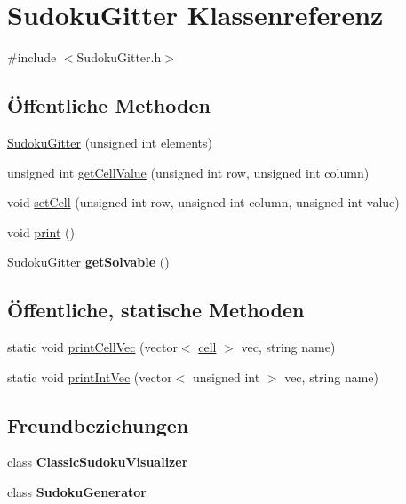 \hypertarget{class_sudoku_gitter}{\section{Sudoku\-Gitter Klassenreferenz}
\label{class_sudoku_gitter}
}


{\ttfamily \#include $<$Sudoku\-Gitter.\-h$>$}

\subsection*{Öffentliche Methoden}
\begin{DoxyCompactItemize}
\item 
\hyperlink{class_sudoku_gitter_ad3443d5846cba4cef8fdfebc46f16c0b}{Sudoku\-Gitter} (unsigned int elements)
\item 
unsigned int \hyperlink{class_sudoku_gitter_aedc91eeba50722d3b4deb0609a27aedf}{get\-Cell\-Value} (unsigned int row, unsigned int column)
\item 
void \hyperlink{class_sudoku_gitter_aa7fa54638ade311994bd8f6433df8ff0}{set\-Cell} (unsigned int row, unsigned int column, unsigned int value)
\item 
void \hyperlink{class_sudoku_gitter_a771332a8a5eff5e1917538adfb237d0e}{print} ()
\item 
\hypertarget{class_sudoku_gitter_ad089a50f3435a3eb025aacab74b8fbed}{\hyperlink{class_sudoku_gitter}{Sudoku\-Gitter} {\bfseries get\-Solvable} ()}\label{class_sudoku_gitter_ad089a50f3435a3eb025aacab74b8fbed}

\end{DoxyCompactItemize}
\subsection*{Öffentliche, statische Methoden}
\begin{DoxyCompactItemize}
\item 
static void \hyperlink{class_sudoku_gitter_a8bbf319c21d2cd6111d36082d3abf78d}{print\-Cell\-Vec} (vector$<$ \hyperlink{structcell}{cell} $>$ vec, string name)
\item 
static void \hyperlink{class_sudoku_gitter_a8496c0d45f5a35e97703787c6756330b}{print\-Int\-Vec} (vector$<$ unsigned int $>$ vec, string name)
\end{DoxyCompactItemize}
\subsection*{Freundbeziehungen}
\begin{DoxyCompactItemize}
\item 
\hypertarget{class_sudoku_gitter_a3f8b3753aa8e1441912c8724f574e730}{class {\bfseries Classic\-Sudoku\-Visualizer}}\label{class_sudoku_gitter_a3f8b3753aa8e1441912c8724f574e730}

\item 
\hypertarget{class_sudoku_gitter_aaf5a078b7eb0c0ad6f5ed7ec84594d48}{class {\bfseries Sudoku\-Generator}}\label{class_sudoku_gitter_aaf5a078b7eb0c0ad6f5ed7ec84594d48}

\end{DoxyCompactItemize}


